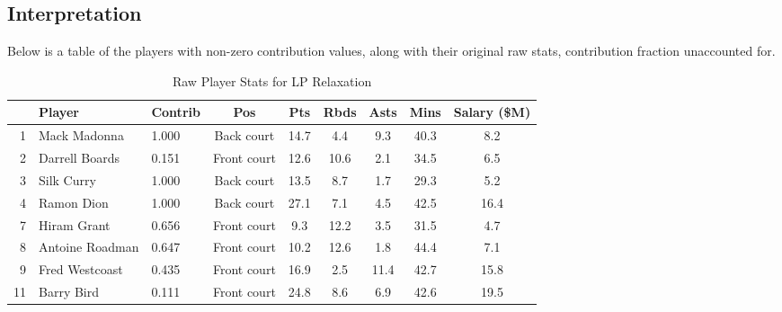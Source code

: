 \documentclass[a4paper,11pt]{article}
\begin{document}
\subsection{Interpretation}
Below is a table of the players with non-zero contribution values, along with their original raw stats, contribution fraction unaccounted for.
\begin{table}[h!]
    \centering
    \begin{tabular}{rllcccccc}
        \hline
        & \textbf{Player} & \textbf{Contrib} & \textbf{Pos} & \textbf{Pts} & \textbf{Rbds} & \textbf{Asts} & \textbf{Mins} & \textbf{Salary (\$M)} \\
        \hline
        1  & Mack Madonna    & 1.000                 & Back court        & 14.7            & 4.4               & 9.3              & 40.3             & 8.2                   \\
        2  & Darrell Boards  & 0.151                 & Front court       & 12.6            & 10.6              & 2.1              & 34.5             & 6.5                   \\
        3  & Silk Curry      & 1.000                 & Back court        & 13.5            & 8.7               & 1.7              & 29.3             & 5.2                   \\
        4  & Ramon Dion      & 1.000                 & Back court        & 27.1            & 7.1               & 4.5              & 42.5             & 16.4                  \\
        7  & Hiram Grant     & 0.656                 & Front court       & 9.3             & 12.2              & 3.5              & 31.5             & 4.7                   \\
        8  & Antoine Roadman & 0.647                 & Front court       & 10.2            & 12.6              & 1.8              & 44.4             & 7.1                   \\
        9  & Fred Westcoast  & 0.435                 & Front court       & 16.9            & 2.5               & 11.4             & 42.7             & 15.8                  \\
        11 & Barry Bird      & 0.111                 & Front court       & 24.8            & 8.6               & 6.9              & 42.6             & 19.5                  \\
        \hline
    \end{tabular}
    \caption{Raw Player Stats for LP Relaxation}
    \label{tab:selected_players_LP}
\end{table}
\end{document}
